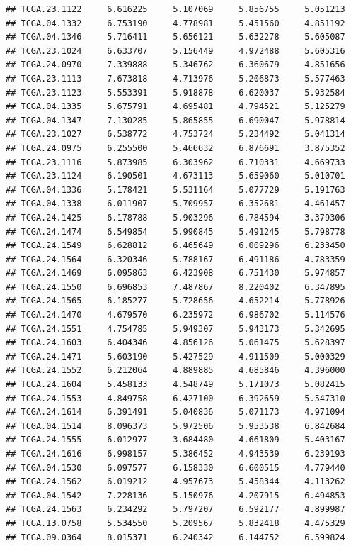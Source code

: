 \documentclass[UTF8]{beamer}\usepackage[]{graphicx}\usepackage[]{color}
\makeatletter
\newenvironment{kframe}{%
 \def\at@end@of@kframe{}%
 \ifinner\ifhmode%
  \def\at@end@of@kframe{\end{minipage}}%
  \begin{minipage}{\columnwidth}%
 \fi\fi%
 \def\FrameCommand##1{\hskip\@totalleftmargin \hskip-\fboxsep
 \colorbox{shadecolor}{##1}\hskip-\fboxsep
     \hskip-\linewidth \hskip-\@totalleftmargin \hskip\columnwidth}%
 \MakeFramed {\advance\hsize-\width
   \@totalleftmargin\z@ \linewidth\hsize
   \@setminipage}}%
 {\par\unskip\endMakeFramed%
 \at@end@of@kframe}
\newenvironment{knitrout}{}{} %
\makeatother
\begin{document}
\begin{frame}[fragile]
\begin{knitrout}
\begin{kframe}
\begin{verbatim}
## TCGA.23.1122     6.616225     5.107069     5.856755     5.051213
## TCGA.04.1332     6.753190     4.778981     5.451560     4.851192
## TCGA.04.1346     5.716411     5.656121     5.632278     5.605087
## TCGA.23.1024     6.633707     5.156449     4.972488     5.605316
## TCGA.24.0970     7.339888     5.346762     6.360679     4.851656
## TCGA.23.1113     7.673818     4.713976     5.206873     5.577463
## TCGA.23.1123     5.553391     5.918878     6.620037     5.932584
## TCGA.04.1335     5.675791     4.695481     4.794521     5.125279
## TCGA.04.1347     7.130285     5.865855     6.690047     5.978814
## TCGA.23.1027     6.538772     4.753724     5.234492     5.041314
## TCGA.24.0975     6.255500     5.466632     6.876691     3.875352
## TCGA.23.1116     5.873985     6.303962     6.710331     4.669733
## TCGA.23.1124     6.190501     4.673113     5.659060     5.010701
## TCGA.04.1336     5.178421     5.531164     5.077729     5.191763
## TCGA.04.1338     6.011907     5.709957     6.352681     4.461457
## TCGA.24.1425     6.178788     5.903296     6.784594     3.379306
## TCGA.24.1474     6.549854     5.990845     5.491245     5.798778
## TCGA.24.1549     6.628812     6.465649     6.009296     6.233450
## TCGA.24.1564     6.320346     5.788167     6.491186     4.783359
## TCGA.24.1469     6.095863     6.423908     6.751430     5.974857
## TCGA.24.1550     6.696853     7.487867     8.220402     6.347895
## TCGA.24.1565     6.185277     5.728656     4.652214     5.778926
## TCGA.24.1470     4.679570     6.235972     6.986702     5.114576
## TCGA.24.1551     4.754785     5.949307     5.943173     5.342695
## TCGA.24.1603     6.404346     4.856126     5.061475     5.628397
## TCGA.24.1471     5.603190     5.427529     4.911509     5.000329
## TCGA.24.1552     6.212064     4.889885     4.685846     4.396000
## TCGA.24.1604     5.458133     4.548749     5.171073     5.082415
## TCGA.24.1553     4.849758     6.427100     6.392659     5.547310
## TCGA.24.1614     6.391491     5.040836     5.071173     4.971094
## TCGA.04.1514     8.096373     5.972506     5.953538     6.842684
## TCGA.24.1555     6.012977     3.684480     4.661809     5.403167
## TCGA.24.1616     6.998157     5.386452     4.943539     6.239193
## TCGA.04.1530     6.097577     6.158330     6.600515     4.779440
## TCGA.24.1562     6.019212     4.957673     5.458344     4.113262
## TCGA.04.1542     7.228136     5.150976     4.207915     6.494853
## TCGA.24.1563     6.234292     5.797207     6.592177     4.899987
## TCGA.13.0758     5.534550     5.209567     5.832418     4.475329
## TCGA.09.0364     8.015371     6.240342     6.144752     6.599824

\end{verbatim}
\end{kframe}
\end{knitrout}
\end{frame}
\end{document}
